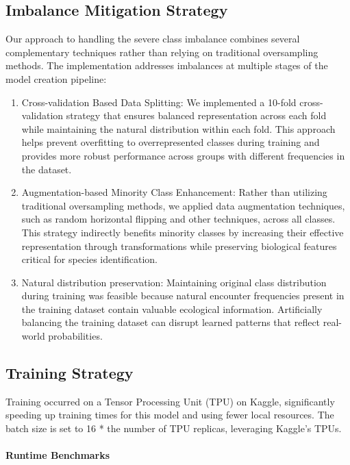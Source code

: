 \documentclass[twocolumn]{article}
\begin{document}
\subsection{Imbalance Mitigation Strategy}

Our approach to handling the severe class imbalance combines several complementary techniques rather than relying on traditional oversampling methods. The implementation addresses imbalances at multiple stages of the model creation pipeline:
\begin{enumerate}
\item Cross-validation Based Data Splitting: We implemented a 10-fold cross-validation strategy that ensures balanced representation across each fold while maintaining the natural distribution within each fold. This approach helps prevent overfitting to overrepresented classes during training and provides more robust performance across groups with different frequencies in the  dataset. 
\item Augmentation-based Minority Class Enhancement: Rather than utilizing traditional oversampling methods, we applied data augmentation techniques, such as random horizontal flipping and other techniques, across all classes. This strategy indirectly benefits minority classes by increasing their effective representation through transformations while preserving biological features critical for species identification.
\item Natural distribution preservation: Maintaining original class distribution during training was feasible because natural encounter frequencies present in the training dataset contain valuable ecological information. Artificially balancing the training dataset can disrupt learned patterns that reflect real-world probabilities. 
\end{enumerate}

\subsection{Training Strategy}

Training occurred on a Tensor Processing Unit (TPU) on Kaggle, significantly speeding up training times for this model and using fewer local resources. The batch size is set to 16 * the number of TPU replicas, leveraging Kaggle’s TPUs.

\paragraph{Runtime Benchmarks}
\end{document}
